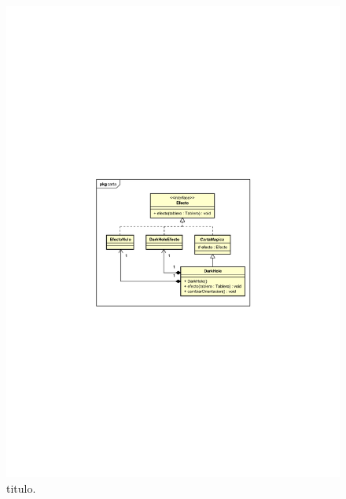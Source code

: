 \begin{figure}[H]
	\centering
	\includegraphics[scale=0.9]{includes/Implementacion_cartas_magicas}
	\caption{titulo.}
	\label{Implementacion_cartas_magicas}
\end{figure}

